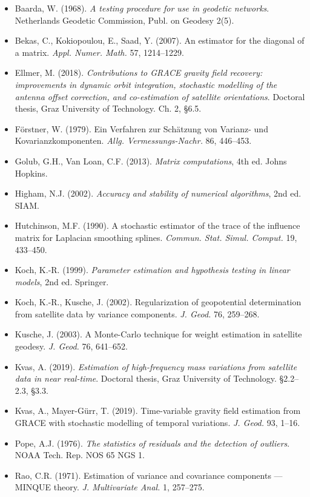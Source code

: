\begin{itemize}
\item Baarda, W. (1968). \emph{A testing procedure for use in geodetic networks}. Netherlands Geodetic Commission, Publ. on Geodesy 2(5).
\item Bekas, C., Kokiopoulou, E., Saad, Y. (2007). An estimator for the diagonal of a matrix. \emph{Appl. Numer. Math.} 57, 1214--1229.
\item Ellmer, M. (2018). \emph{Contributions to GRACE gravity field recovery: improvements in dynamic orbit integration, stochastic modelling of the antenna offset correction, and co-estimation of satellite orientations}. Doctoral thesis, Graz University of Technology. Ch. 2, §6.5.
\item Förstner, W. (1979). Ein Verfahren zur Schätzung von Varianz- und Kovarianzkomponenten. \emph{Allg. Vermessungs-Nachr.} 86, 446--453.
\item Golub, G.H., Van Loan, C.F. (2013). \emph{Matrix computations}, 4th ed. Johns Hopkins.
\item Higham, N.J. (2002). \emph{Accuracy and stability of numerical algorithms}, 2nd ed. SIAM.
\item Hutchinson, M.F. (1990). A stochastic estimator of the trace of the influence matrix for Laplacian smoothing splines. \emph{Commun. Stat. Simul. Comput.} 19, 433--450.
\item Koch, K.-R. (1999). \emph{Parameter estimation and hypothesis testing in linear models}, 2nd ed. Springer.
\item Koch, K.-R., Kusche, J. (2002). Regularization of geopotential determination from satellite data by variance components. \emph{J. Geod.} 76, 259--268.
\item Kusche, J. (2003). A Monte-Carlo technique for weight estimation in satellite geodesy. \emph{J. Geod.} 76, 641--652.
\item Kvas, A. (2019). \emph{Estimation of high-frequency mass variations from satellite data in near real-time}. Doctoral thesis, Graz University of Technology. §2.2--2.3, §3.3.
\item Kvas, A., Mayer-Gürr, T. (2019). Time-variable gravity field estimation from GRACE with stochastic modelling of temporal variations. \emph{J. Geod.} 93, 1--16.
\item Pope, A.J. (1976). \emph{The statistics of residuals and the detection of outliers}. NOAA Tech. Rep. NOS 65 NGS 1.
\item Rao, C.R. (1971). Estimation of variance and covariance components --- MINQUE theory. \emph{J. Multivariate Anal.} 1, 257--275.

\end{itemize}

